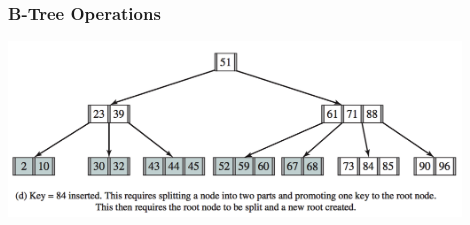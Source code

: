 \begin{frame}
\frametitle{B-Tree Operations}


\begin{center}
	\includegraphics[width=0.9\textwidth]{images/b-tree-insert-bottom.png}
\end{center}


\end{frame}



